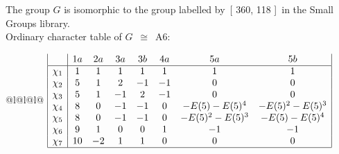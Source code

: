 \documentclass[varwidth=\maxdimen,border=10]{standalone}
\begin{document}
The group $G$ is isomorphic to the group labelled by\ [ 360, 118 ]\ in the Small Groups library.\\
Ordinary character table of $G$\ $\cong$\ A6:\\
\begin{center}
\begin{tabular}{@{}l@{}l@{}l@{}}
\hline
\(\begin{array}{|l|ccccccc|}
  & 1a & 2a & 3a & 3b & 4a & 5a & 5b\\ \hline
\chi_{1} & 1 & 1 & 1 & 1 & 1 & 1 & 1\\
\chi_{2} & 5 & 1 & 2 & -1 & -1 & 0 & 0\\
\chi_{3} & 5 & 1 & -1 & 2 & -1 & 0 & 0\\
\chi_{4} & 8 & 0 & -1 & -1 & 0 & -E(5)-E(5)^{4} & -E(5)^{2}-E(5)^{3}\\
\chi_{5} & 8 & 0 & -1 & -1 & 0 & -E(5)^{2}-E(5)^{3} & -E(5)-E(5)^{4}\\
\chi_{6} & 9 & 1 & 0 & 0 & 1 & -1 & -1\\
\chi_{7} & 10 & -2 & 1 & 1 & 0 & 0 & 0\\
\hline
\end{array}\)\\
\end{tabular}
\end{center}
\end{document}
